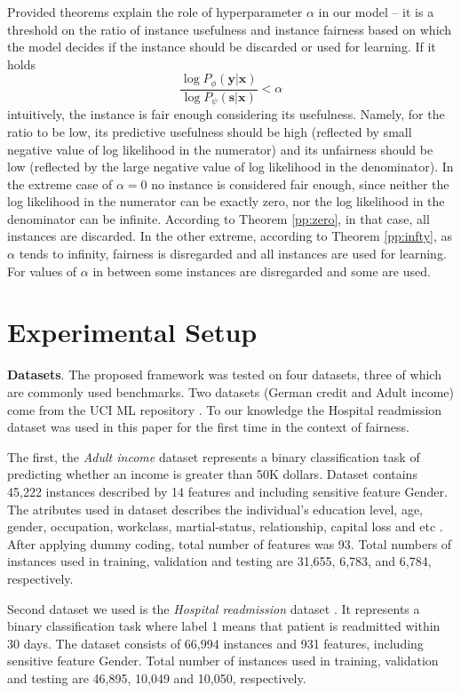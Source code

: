 \documentclass[preprint,12pt]{elsarticle}
\begin{document}
Provided theorems explain the role of hyperparameter $\alpha$ in our model -- it is a threshold on the ratio of instance usefulness and instance fairness based on which the model decides if the instance should be discarded or used for learning.
If it holds
$$\frac{\log P_{\phi}(\mathbf{y}|\mathbf{x})}{\log P_{\psi}(\mathbf{s}|\mathbf{x})}<\alpha$$
intuitively, the instance is fair enough considering its usefulness. Namely, for the ratio to be low, its predictive usefulness should be high (reflected by small negative value of log likelihood in the numerator) and its unfairness should be low (reflected by the large negative value of log likelihood in the denominator). In the extreme case of $\alpha=0$ no instance is considered fair enough, since neither the log likelihood in the numerator can be exactly zero, nor the log likelihood in the denominator can be infinite. According to Theorem \ref{pp:zero}, in that case, all instances are discarded. In the other extreme, according to Theorem \ref{pp:infty}, as $\alpha$ tends to infinity,  fairness is disregarded and all instances are used for learning. For values of $\alpha$ in between some instances are disregarded and some are used.


\section{Experimental Setup}
\label{Sec:exp-evaluation}

\textbf{Datasets}. The proposed framework was tested on four datasets, three of which are commonly used benchmarks. Two datasets (German credit and Adult income) come from the UCI ML repository \cite{frank2011uci}. To our knowledge the Hospital readmission dataset was used in this paper for the first time in the context of fairness.

The first, the \textit{Adult income} dataset \cite{kohavi1996scaling} represents a binary classification task of predicting whether an income is greater than 50K dollars. Dataset contains 45,222 instances described by 14 features and including sensitive feature Gender. The atributes used in dataset describes the individual's education level, age, gender, occupation, workclass, martial-status, relationship, capital loss and etc \cite{Dua:2019}. After applying dummy coding, total number of features was 93. Total numbers of instances used in training, validation and testing are 31,655, 6,783, and 6,784, respectively.

Second dataset we used is the \textit{Hospital readmission} dataset \cite{stiglic2015comprehensible}. It represents a binary classification task where label 1 means that patient is readmitted within 30 days. The dataset consists of 66,994 instances and 931 features, including sensitive feature Gender. Total number of instances used in training, validation and testing are 46,895, 10,049 and 10,050, respectively.
\end{document}
